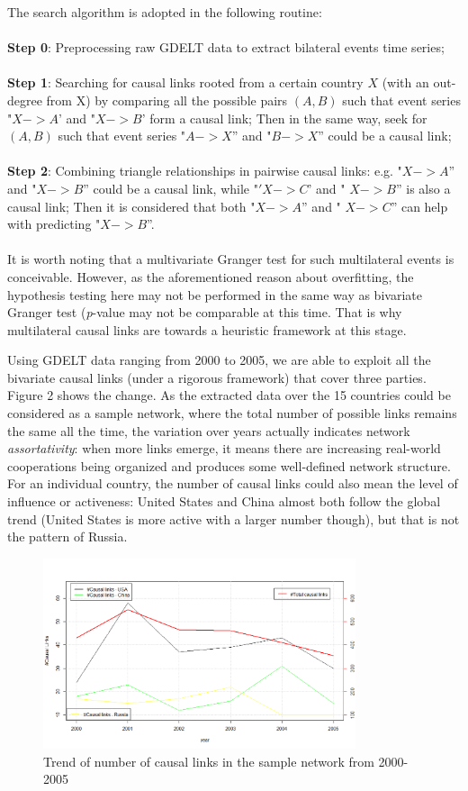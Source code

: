 \documentclass[runningheads,a4paper]{llncs}
\begin{document}
The search algorithm is adopted in the following routine: 
\\
\\
\textbf{Step 0}: Preprocessing raw GDELT data to extract bilateral events time series;
\\
\\
\textbf{Step 1}: Searching for causal links rooted from a certain country $X$ (with an out-degree from X) by comparing all the possible pairs $(A,B)$  such that event series "$X -> A$' and "$X -> B$' form a causal link; Then in the same way, seek for $(A,B)$ such that event series "$A -> X$'' and "$B -> X$'' could be a causal link;
\\
\\
\textbf{Step 2}:  Combining triangle relationships in pairwise causal links: e.g. "$X -> A$'' and "$X -> B$'' could be a causal link, while "$'X -> C$' and " $X -> B$'' is also a causal link; Then it is considered that both "$X -> A$'' and " $X -> C$'' can help with predicting "$ X-> B$''. 
\\
\\
It is worth noting that a multivariate Granger test for such multilateral events is conceivable. However, as the aforementioned reason about overfitting, the hypothesis testing here may not be performed in the same way as bivariate Granger test ({\em p}-value may not be comparable at this time. That is why multilateral causal links are towards a heuristic framework at this stage.

Using GDELT data ranging from 2000 to 2005, we are able to exploit all the bivariate causal links (under a rigorous framework) that cover three parties. Figure 2 shows the change. As the extracted data over the 15 countries could be considered as a sample network, where the total number of possible links remains the same all the time, the variation over years actually indicates network {\em assortativity}: when more links emerge, it means there are increasing real-world cooperations being organized and produces some well-defined network structure. For an individual country, the number of causal links could also mean the level of influence or activeness: United States and China almost both follow the global trend (United States is more active with a larger number though), but that is not the pattern of Russia.

\begin{figure}[!htb]
\label{fig:2}
\centering
\includegraphics[width=\linewidth, height=2.2in]{causallinktrend}
\caption{Trend of number of causal links in the sample network from 2000-2005}
\end{figure} 
\end{document}

